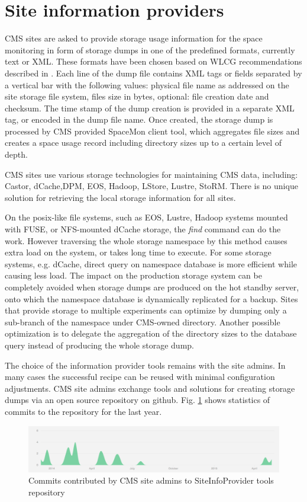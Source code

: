 \section {Site information providers}

CMS sites are asked to provide storage usage information for the space 
monitoring in form of storage dumps in one of the predefined formats, currently 
text or XML. These formats have been chosen based on WLCG recommendations described 
in \cite{storagedumps}. Each line of the dump file contains  XML  tags or fields 
separated by a vertical bar with the following values: physical file name as 
addressed on the site storage file system, files size in bytes, optional: 
file creation date and checksum. The time stamp of the dump creation is provided 
in a separate XML tag, or encoded in the dump file name.
Once created, the storage dump is processed by CMS provided SpaceMon client tool, 
which aggregates file sizes and creates a space usage record including directory 
sizes up to a certain level of depth. 

CMS sites use various storage technologies for maintaining CMS data, including:
Castor, dCache,DPM, EOS, Hadoop, LStore, Lustre, StoRM. There is no unique 
solution for retrieving the local storage information for all sites. 

On the posix-like file systems, such as EOS, Lustre, Hadoop systems mounted 
with FUSE, or NFS-mounted dCache storage, the {\it find} command can do the work.
However traversing the whole storage namespace by this method causes extra 
load on the system, or takes long time to execute. For some storage systems, 
e.g. dCache, direct query on namespace database is more efficient
while causing less load. The impact on the production storage system can be
completely avoided when storage dumps are produced on the hot standby server, 
onto which the namespace database is dynamically replicated for a backup. 
Sites that provide storage to multiple experiments can optimize by dumping 
only a sub-branch of the namespace under CMS-owned directory. 
Another possible optimization is to delegate the aggregation of the directory sizes 
to the database query instead of producing the whole storage dump. 

The choice of the information provider tools remains with the site admins. 
In many cases the successful recipe can be reused with minimal configuration
adjustments. CMS site admins exchange tools and solutions for creating storage 
dumps via an open source repository on github. Fig. \ref{fig:github_stats} shows
statistics of commits to the repository for the last year. 

\begin{figure}[h]
\center
\includegraphics[width=1.0\linewidth]
{pictures/sites_contributions.pdf}
\caption{Commits contributed by CMS site admins to SiteInfoProvider tools repository}
\label{fig:github_stats}
\end{figure}

